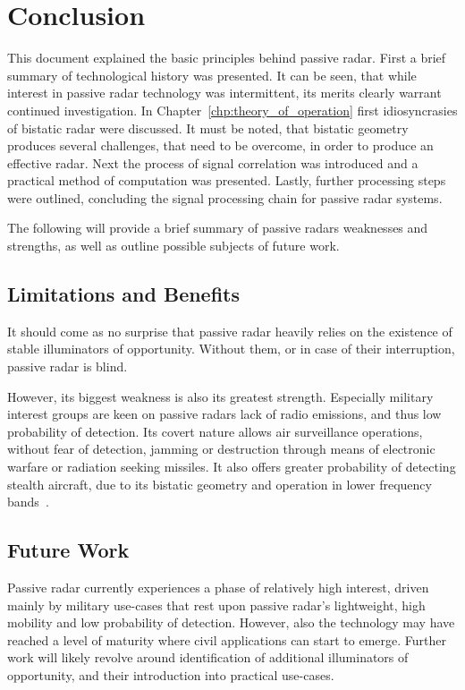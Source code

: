 \chapter{Conclusion}

This document explained the basic principles behind passive radar. First a brief summary of technological history was presented. It can be seen, that while interest in passive radar technology was intermittent, its merits clearly warrant continued investigation.
In Chapter~\ref{chp:theory_of_operation} first idiosyncrasies of bistatic radar were discussed. It must be noted, that bistatic geometry produces several challenges, that need to be overcome, in order to produce an effective radar. Next the process of signal correlation was introduced and a practical method of computation was presented. Lastly, further processing steps were outlined, concluding the signal processing chain for passive radar systems.

The following will provide a brief summary of passive radars weaknesses and strengths, as well as outline possible subjects of future work.

\section{Limitations and Benefits}

It should come as no surprise that passive radar heavily relies on the existence of stable illuminators of opportunity. Without them, or in case of their interruption, passive radar is blind.

However, its biggest weakness is also its greatest strength. Especially military interest groups are keen on passive radars lack of radio emissions, and thus low probability of detection. Its covert nature allows air surveillance operations, without fear of detection, jamming or destruction through means of electronic warfare or radiation seeking missiles. It also offers greater probability of detecting stealth aircraft, due to its bistatic geometry and operation in lower frequency bands~\cite[p.~2]{Malanowski2019}.

\section{Future Work}

Passive radar currently experiences a phase of relatively high interest, driven mainly by military use-cases that rest upon passive radar's lightweight, high mobility and low probability of detection. However, also the technology may have reached a level of maturity where civil applications can start to emerge. Further work will likely revolve around identification of additional illuminators of opportunity, and their introduction into practical use-cases.
